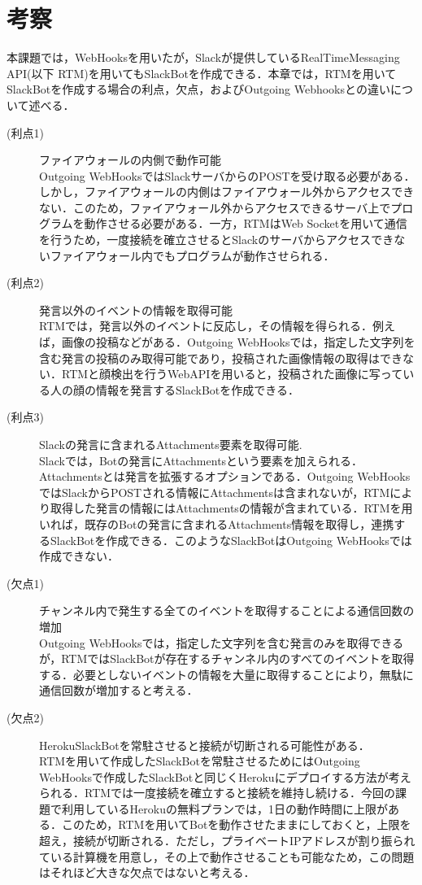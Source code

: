 \documentclass[fleqn, 14pt]{extarticlej}
\begin{document}
\section{考察}
本課題では，WebHooksを用いたが，Slackが提供しているRealTimeMessaging API(以下 RTM)を用いてもSlackBotを作成できる．本章では，RTMを用いてSlackBotを作成する場合の利点，欠点，およびOutgoing Webhooksとの違いについて述べる．
\begin{description}
 
\item[(利点1)] ファイアウォールの内側で動作可能\\
  Outgoing WebHooksではSlackサーバからのPOSTを受け取る必要がある．しかし，ファイアウォールの内側はファイアウォール外からアクセスできない．このため，ファイアウォール外からアクセスできるサーバ上でプログラムを動作させる必要がある．一方，RTMはWeb Socketを用いて通信を行うため，一度接続を確立させるとSlackのサーバからアクセスできないファイアウォール内でもプログラムが動作させられる．
\item[(利点2)] 発言以外のイベントの情報を取得可能\\
  RTMでは，発言以外のイベントに反応し，その情報を得られる．例えば，画像の投稿などがある．Outgoing WebHooksでは，指定した文字列を含む発言の投稿のみ取得可能であり，投稿された画像情報の取得はできない．RTMと顔検出を行うWebAPIを用いると，投稿された画像に写っている人の顔の情報を発言するSlackBotを作成できる．
\item[(利点3)] Slackの発言に含まれるAttachments要素を取得可能.\\
  Slackでは，Botの発言にAttachmentsという要素を加えられる．Attachmentsとは発言を拡張するオプションである．Outgoing WebHooksではSlackからPOSTされる情報にAttachmentsは含まれないが，RTMにより取得した発言の情報にはAttachmentsの情報が含まれている．RTMを用いれば，既存のBotの発言に含まれるAttachments情報を取得し，連携するSlackBotを作成できる．このようなSlackBotはOutgoing WebHooksでは作成できない．
\item[(欠点1)]チャンネル内で発生する全てのイベントを取得することによる通信回数の増加\\
  Outgoing WebHooksでは，指定した文字列を含む発言のみを取得できるが，RTMではSlackBotが存在するチャンネル内のすべてのイベントを取得する．必要としないイベントの情報を大量に取得することにより，無駄に通信回数が増加すると考える．
\item[(欠点2)]HerokuSlackBotを常駐させると接続が切断される可能性がある．\\
  RTMを用いて作成したSlackBotを常駐させるためにはOutgoing WebHooksで作成したSlackBotと同じくHerokuにデプロイする方法が考えられる．RTMでは一度接続を確立すると接続を維持し続ける．今回の課題で利用しているHerokuの無料プランでは，1日の動作時間に上限がある．このため，RTMを用いてBotを動作させたままにしておくと，上限を超え，接続が切断される．ただし，プライベートIPアドレスが割り振られている計算機を用意し，その上で動作させることも可能なため，この問題はそれほど大きな欠点ではないと考える．
\end{description}
\end{document}
